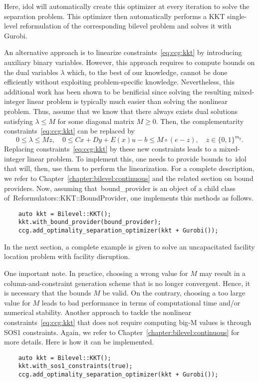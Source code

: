 Here, \textsf{idol} will automatically create this optimizer at every
iteration to solve the separation problem. This optimizer then automatically
performs a KKT single-level reformulation of the corresponding bilevel problem
and solves it with \textsf{Gurobi}.

An alternative approach is to linearize
constraints~\eqref{eq:ccg:kkt} by introducing auxiliary binary variables.
However, this approach requires to compute bounds on the dual variables
$\lambda$ which, to the best of our knowledge, cannot be done efficiently
without exploiting problem-specific knowledge. Nevertheless, this additional
work has been shown to be benificial since solving the resulting mixed-integer
linear problem is typically much easier than solving the nonlinear problem.
Thus, assume that we know that there always exists dual solutions satisfying
$\lambda \le M$ for some diagonal matrix $M \ge 0$. Then, the complementarity
constraints~\eqref{eq:ccg:kkt} can be replaced by
\begin{equation*}
    0 \le \lambda \le Mz, \quad 
    0 \le Cx + Dy + E(x)u - b \le M\circ(e - z), \quad 
    z\in\{0,1\}^{m_y}.
\end{equation*}
Replacing constraints~\eqref{eq:ccg:kkt} by these new constraints leads to a
mixed-integer linear problem. To implement this, one needs to provide bounds
to~\textsf{idol} that will, then, use them to perform the linearization. For a
complete description, we refer to Chapter~\ref{chapter:bilevel:continuous} and
the related section on bound providers. Now, assuming
that~\textsf{bound\_provider} is an object of a child class
of~\textsf{Reformulators::KKT::BoundProvider}, one implements this methods as
follows.
%
\begin{lstlisting}
    auto kkt = Bilevel::KKT();
    kkt.with_bound_provider(bound_provider);
    ccg.add_optimality_separation_optimizer(kkt + Gurobi());
\end{lstlisting}
%
In the next section, a complete example is given to solve an uncapacitated
facility location problem with facility disruption. 

One important note. In practice, choosing a wrong value for $M$ may result in
a column-and-constraint generation scheme that is no longer convergent. Hence,
it is necessary that the bounds $M$ be valid. On the contrary, choosing a too
large value for $M$ leads to bad performance in terms of computational time
and/or numerical stability. Another approach to tackle the nonlinear
constraints~\eqref{eq:ccg:kkt} that does not require computing big-M values is
through SOS1 constraints. Again, we refer to
Chapter~\ref{chapter:bilevel:continuous} for more details. Here is how it can
be implemented.
%
\begin{lstlisting}
    auto kkt = Bilevel::KKT();
    kkt.with_sos1_constraints(true);
    ccg.add_optimality_separation_optimizer(kkt + Gurobi());
\end{lstlisting}

